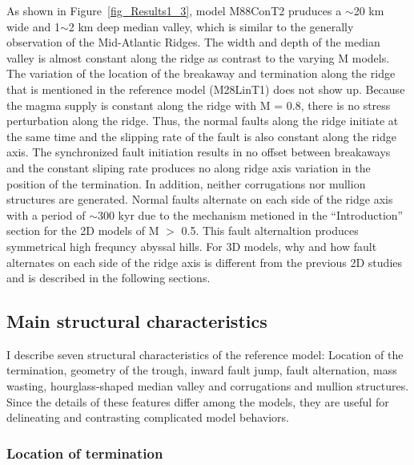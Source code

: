 As shown in Figure~\hyperref[fig_Results1_3]{\ref{fig_Results1_3}}, model M88ConT2 pruduces a $\sim$20 km wide and 1$\sim$2 km deep median valley, which is similar to the generally observation of the Mid-Atlantic Ridges. The width and depth of the median valley is almost constant along the ridge as contrast to the varying M models. The variation of the location of the breakaway and termination along the ridge that is mentioned in the reference model (M28LinT1) does not show up. Because the magma supply is constant along the ridge with M = 0.8, there is no stress perturbation along the ridge. Thus, the normal faults along the ridge initiate at the same time and the slipping rate of the fault is also constant along the ridge axis. The synchronized fault initiation results in no offset between breakaways and the constant sliping rate produces no along ridge axis variation in the position of the termination. In addition, neither corrugations nor mullion structures are generated. Normal faults alternate on each side of the ridge axis with a period of $\sim$300 kyr due to the mechanism metioned in the ``Introduction'' section for the 2D models of M $>$ 0.5. This fault alternaltion produces symmetrical high frequncy abyssal hills. For 3D models, why and how fault alternates on each side of the ridge axis is different from the previous 2D studies and is described in the following sections. 

\subsection{Main structural characteristics}
I describe seven structural characteristics of the reference model: Location of the termination, geometry of the trough, inward fault jump, fault alternation, mass wasting, hourglass-shaped median valley and corrugations and mullion structures. Since the details of these features differ among the models, they are useful for delineating and contrasting complicated model behaviors.

\subsubsection{Location of termination}

